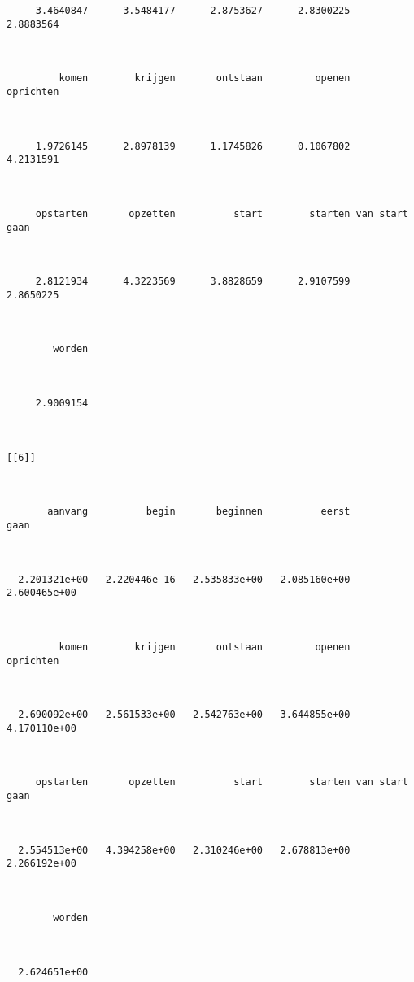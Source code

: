 \begin{lstlisting}
     3.4640847      3.5484177      2.8753627      2.8300225      2.8883564 



         komen        krijgen       ontstaan         openen      oprichten 



     1.9726145      2.8978139      1.1745826      0.1067802      4.2131591 



     opstarten       opzetten          start        starten van start gaan 



     2.8121934      4.3223569      3.8828659      2.9107599      2.8650225 



        worden 



     2.9009154 



[[6]]



       aanvang          begin       beginnen          eerst           gaan 



  2.201321e+00   2.220446e-16   2.535833e+00   2.085160e+00   2.600465e+00 



         komen        krijgen       ontstaan         openen      oprichten 



  2.690092e+00   2.561533e+00   2.542763e+00   3.644855e+00   4.170110e+00 



     opstarten       opzetten          start        starten van start gaan 



  2.554513e+00   4.394258e+00   2.310246e+00   2.678813e+00   2.266192e+00 



        worden 



  2.624651e+00 
\end{lstlisting}

